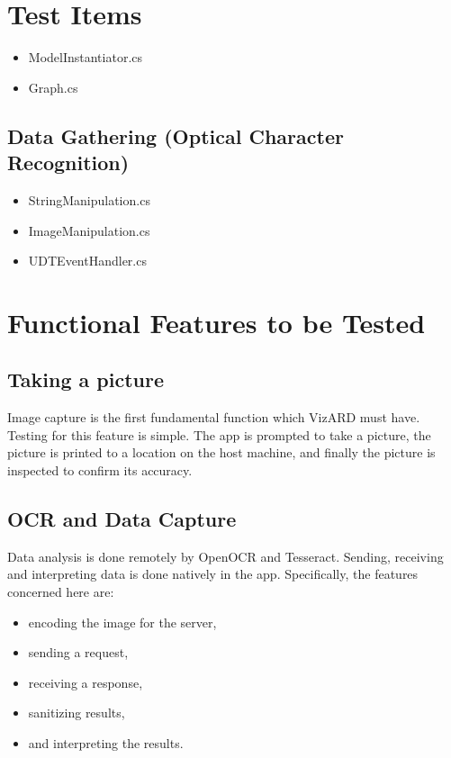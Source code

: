 \documentclass[a4paper,12pt]{article}
\begin{document}
\section{Test Items}

\begin{itemize}
\subsection{Display Graph (Augmented Reality}
\item ModelInstantiator.cs
\item Graph.cs
\end{itemize}

\subsection{Data Gathering (Optical Character Recognition)}
\begin{itemize}
\item StringManipulation.cs
\item ImageManipulation.cs
\item UDTEventHandler.cs
\end{itemize}
\section{Functional Features to be Tested}
\subsection{Taking a picture}
Image capture is the first fundamental function which VizARD must have. Testing for this feature is simple. The app is prompted to take a picture, the picture is printed to a location on the host machine, and finally the picture is inspected to confirm its accuracy.

\subsection{OCR and Data Capture}
Data analysis is done remotely by OpenOCR and Tesseract. Sending, receiving and interpreting data is done natively in the app. Specifically, the features concerned here are:
\begin{itemize}
	\item encoding the image for the server,
	\item sending a request,
	\item receiving a response,
	\item sanitizing results,
	\item and interpreting the results.
\end{itemize}
\end{document}
